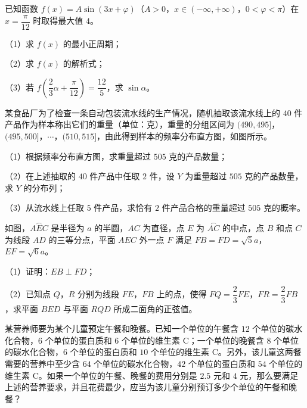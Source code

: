 \begin{question}
已知函数 $f(x)=A\sin(3x+\varphi)$（$A>0$，$x\in(-\infty,+\infty)$，$0<\varphi<\pi$）在 $x=\dfrac\pi{12}$ 时取得最大值 $4$。

（1）求 $f(x)$ 的最小正周期；

（2）求 $f(x)$ 的解析式；

（3）若 $f\left(\dfrac23\alpha+\dfrac\pi{12}\right)=\dfrac{12}5$，求 $\sin\alpha$。

\Needspace{0.4\textheight}
\end{question}
\begingroup
\renewenvironment{question}{\Needspace{0.5\textheight}}{}
\begin{question}
某食品厂为了检查一条自动包装流水线的生产情况，随机抽取该流水线上的 $40$ 件产品作为样本称出它们的重量（单位：克），重量的分组区间为 $(490,495]$，$(495,500]$，$\cdots$，$(510,515]$，由此得到样本的频率分布直方图，如图所示。
\nopagebreak[4]
\begin{center}\end{center}
\nopagebreak[4]
（1）根据频率分布直方图，求重量超过 $505$ 克的产品数量；

（2）在上述抽取的 $40$ 件产品中任取 $2$ 件，设 $Y$ 为重量超过 $505$ 克的产品数量，求 $Y$ 的分布列；

（3）从流水线上任取 $5$ 件产品，求恰有 $2$ 件产品合格的重量超过 $505$ 克的概率。

\Needspace{0.4\textheight}
\end{question}
\endgroup
\begingroup
\renewenvironment{question}{\Needspace{0.5\textheight}}{}
\begin{question}
如图，$\overset{\frown}{AEC}$ 是半径为 $a$ 的半圆，$AC$ 为直径，点 $E$ 为 $\overset{\frown}{AC}$ 的中点，点 $B$ 和点 $C$ 为线段 $AD$ 的三等分点，平面 $AEC$ 外一点 $F$ 满足 $FB=FD=\sqrt5a$，$EF=\sqrt6a$。

（1）证明：$EB\perp FD$；

（2）已知点 $Q$，$R$ 分别为线段 $FE$，$FB$ 上的点，使得 $FQ=\dfrac23FE$，$FR=\dfrac23FB$，求平面 $BED$ 与平面 $RQD$ 所成二面角的正弦值。
\nopagebreak[4]
\begin{center}\end{center}
\nopagebreak[4]
\end{question}
\endgroup
\begin{question}
某营养师要为某个儿童预定午餐和晚餐。已知一个单位的午餐含 $12$ 个单位的碳水化合物，$6$ 个单位的蛋白质和 $6$ 个单位的维生素 C；一个单位的晚餐含 $8$ 个单位的碳水化合物，$6$ 个单位的蛋白质和 $10$ 个单位的维生素 C。另外，该儿童这两餐需要的营养中至少含 $64$ 个单位的碳水化合物，$42$ 个单位的蛋白质和 $54$ 个单位的维生素 C。如果一个单位的午餐、晚餐的费用分别是 $2.5$ 元和 $4$ 元，那么要满足上述的营养要求，并且花费最少，应当为该儿童分别预订多少个单位的午餐和晚餐？

\end{question}

